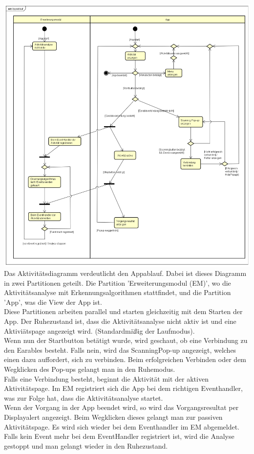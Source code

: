 \documentclass[a4paper,12pt]{article}
\begin{document}
\includegraphics[width=1.1\textwidth]{./Diagramme/Appablauf.png}\\
Das Aktivitätsdiagramm verdeutlicht den Appablauf. Dabei ist dieses Diagramm in zwei Partitionen geteilt. Die Partition 'Erweiterungsmodul (EM)', wo die Aktivitätsanalyse mit Erkennungsalgorithmen stattfindet, und die  Partition 'App', was die View der App ist.\\
Diese Partitionen arbeiten parallel und starten gleichzeitig mit dem Starten der App. Der Ruhezustand ist, dass die Aktivitätsanalyse nicht aktiv ist und eine Aktiviätspage angezeigt wird. (Standardmäßig der Laufmodus).\\
Wenn nun der Startbutton betätigt wurde, wird geschaut, ob eine Verbindung zu den \Gls{Earables} besteht. Falls nein, wird das ScanningPop-up angezeigt, welches einen dazu auffordert, sich zu verbinden.
Beim erfolgreichen Verbinden oder dem Wegklicken des Pop-ups gelangt man in den Ruhemodus.\\
Falls eine Verbindung besteht, beginnt die Aktivität mit der aktiven Aktivitätspage. Im EM registriert sich die App bei dem richtigen Eventhandler, was zur Folge hat, dass die Aktivitätsanalyse startet.\\
Wenn der Vorgang in der App beendet wird, so wird das Vorgangsresultat per Displayalert angezeigt. Beim Wegklicken dieses gelangt man zur passiven Aktivitätspage. Es wird sich wieder bei dem Eventhandler im EM abgemeldet.\\
Falls kein Event mehr bei dem EventHandler registriert ist, wird die Analyse gestoppt und man gelangt wieder in den Ruhezustand.\\
\newpage
\end{document}
